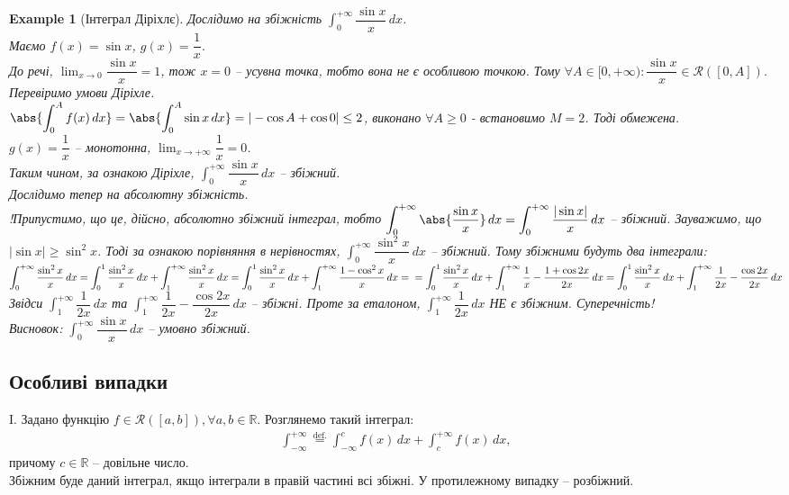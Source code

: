 \documentclass[a4paper, 10pt]{article}
\def\huge{\displaystyle}
\theoremstyle{theoremdd}
\theoremstyle{theoremdd}
\theoremstyle{theoremdd}
\theoremstyle{theoremdd}
\theoremstyle{theoremdd}
\newtheorem{example}[theorem]{Example}
\theoremstyle{theoremdd}
\theoremstyle{theoremdd}
\theoremstyle{theoremdd}
\theoremstyle{theoremdd}
\begin{document}
\begin{example}[Інтеграл Діріхлє]
Дослідимо на збіжність $\huge\int_0^{+\infty} \dfrac{\sin x}{x}\,dx$.\\
Маємо $f(x) = \sin x$, $g(x) = \dfrac{1}{x}$.\\
До речі, $\huge\lim_{x \to 0} \dfrac{\sin x}{x} = 1$, тож $x = 0$ -- усувна точка, тобто вона не є особливою точкою. Тому $\forall A \in [0,+\infty): \dfrac{\sin x}{x} \in \mathcal{R}([0,A])$.\\
Перевіримо умови Діріхле.\\
$\abs{\huge\int_0^{A} f(x)\,dx} = \abs{\huge\int_0^A \sin x \,dx} = |-\cos A + \cos 0| \leq 2$, виконано $\forall A \geq 0$ - встановимо $M = 2$. Тоді обмежена.\\
$g(x) = \dfrac{1}{x}$ -- монотонна, $\huge\lim_{x \to +\infty} \dfrac{1}{x} = 0$.\\
Таким чином, за ознакою Діріхле,  $\huge\int_0^{+\infty} \dfrac{\sin x}{x}\,dx$  -- збіжний.
\bigskip \\
Дослідимо тепер на абсолютну збіжність.\\
!Припустимо, що це, дійсно, абсолютно збіжний інтеграл, тобто
$\huge\int_0^{+\infty} \abs{\dfrac{\sin x}{x}}\,dx = \huge\int_0^{+\infty} \dfrac{|\sin x|}{x}\,dx$ -- збіжний. Зауважимо, що $|\sin x| \geq \sin^2 x$. Тоді за ознакою порівняння в нерівностях, $\huge\int_0^{+\infty} \dfrac{\sin^2 x}{x}\,dx$ -- збіжний. Тому збіжними будуть два інтеграли:\\
$\huge\int_0^{+\infty} \dfrac{\sin^2 x}{x}\,dx = \huge\int_0^1 \dfrac{\sin^2 x}{x}\,dx + \huge\int_1^{+\infty} \dfrac{\sin^2 x}{x}\,dx =
\huge\int_0^1 \dfrac{\sin^2 x}{x}\,dx + \huge\int_1^{+\infty} \dfrac{1 - \cos^2 x}{x}\,dx = \\ = \huge\int_0^1 \dfrac{\sin^2 x}{x}\,dx + \huge\int_1^{+\infty} \dfrac{1}{x} - \dfrac{1+\cos 2x}{2x} \,dx = \huge\int_0^1 \dfrac{\sin^2 x}{x}\,dx + \huge\int_1^{+\infty} \dfrac{1}{2x} - \dfrac{\cos 2x}{2x} \,dx$\\
Звідси $\huge\int_1^{+\infty} \dfrac{1}{2x} \,dx$ та $\huge\int_1^{+\infty} \dfrac{1}{2x}-\dfrac{\cos 2x}{2x} \,dx$ -- збіжні. Проте за еталоном, $\huge\int_1^{+\infty} \dfrac{1}{2x} \,dx$ НЕ є збіжним. Суперечність!\\
Висновок: $\huge\int_0^{+\infty} \dfrac{\sin x}{x}\,dx$ -- умовно збіжний.
\end{example}

\subsection{Особливі випадки}
I. Задано функцію $f \in \mathcal{R}([a,b]), \forall a,b \in \mathbb{R}$. Розглянемо такий інтеграл:
\begin{align*}
\int_{-\infty}^{+\infty} \overset{\text{def.}}{=} \int_{-\infty}^c f(x)\,dx + \int_c^{+\infty} f(x)\,dx,
\end{align*}
причому $c \in \mathbb{R}$ -- довільне число.\\
Збіжним буде даний інтеграл, якщо інтеграли в правій частині всі збіжні. У протилежному випадку -- розбіжний.
\end{document}
